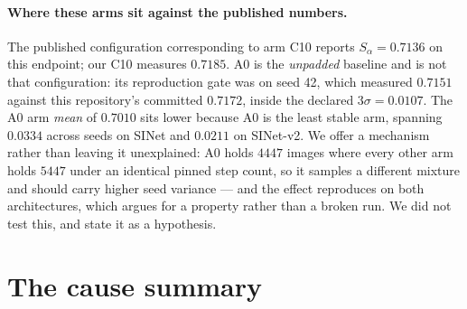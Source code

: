 \documentclass{article} %
\begin{document}
\paragraph{Where these arms sit against the published numbers.} The published configuration
corresponding to arm C10 reports $S_\alpha = 0.7136$ on this endpoint; our C10 measures $0.7185$. A0
is the \emph{unpadded} baseline and is not that configuration: its reproduction gate was on seed 42, which measured $0.7151$ against this repository's committed $0.7172$, inside the declared
$3\sigma = 0.0107$. The A0 arm \emph{mean} of $0.7010$ sits lower because A0 is the least stable arm,
spanning $0.0334$ across seeds on SINet and $0.0211$ on SINet-v2. We offer a mechanism rather than
leaving it unexplained: A0 holds $4447$ images where every other arm holds $5447$ under an identical
pinned step count, so it samples a different mixture and should carry higher seed variance --- and the
effect reproduces on both architectures, which argues for a property rather than a broken run. We did
not test this, and state it as a hypothesis.


\section{The cause summary}
\label{app:causes}
\end{document}

